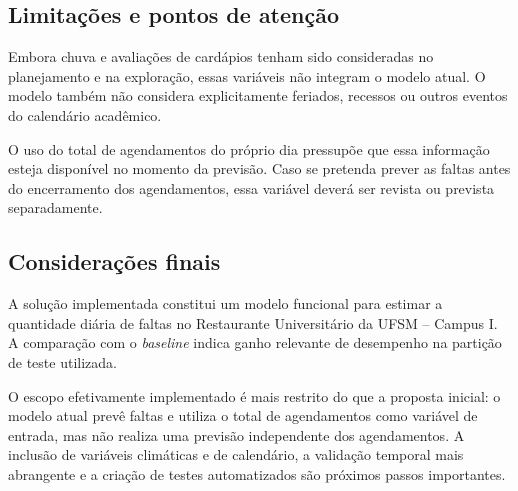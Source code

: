 \documentclass[11pt,a4paper]{article}
\begin{document}
\subsection{Limitações e pontos de atenção}

Embora chuva e avaliações de cardápios tenham sido consideradas no planejamento e na exploração, essas variáveis não integram o modelo atual. O modelo também não considera explicitamente feriados, recessos ou outros eventos do calendário acadêmico.

O uso do total de agendamentos do próprio dia pressupõe que essa informação esteja disponível no momento da previsão. Caso se pretenda prever as faltas antes do encerramento dos agendamentos, essa variável deverá ser revista ou prevista separadamente.

\subsection{Considerações finais}

A solução implementada constitui um modelo funcional para estimar a quantidade diária de faltas no Restaurante Universitário da UFSM -- Campus I. A comparação com o \textit{baseline} indica ganho relevante de desempenho na partição de teste utilizada.

O escopo efetivamente implementado é mais restrito do que a proposta inicial: o modelo atual prevê faltas e utiliza o total de agendamentos como variável de entrada, mas não realiza uma previsão independente dos agendamentos. A inclusão de variáveis climáticas e de calendário, a validação temporal mais abrangente e a criação de testes automatizados são próximos passos importantes.
\end{document}
